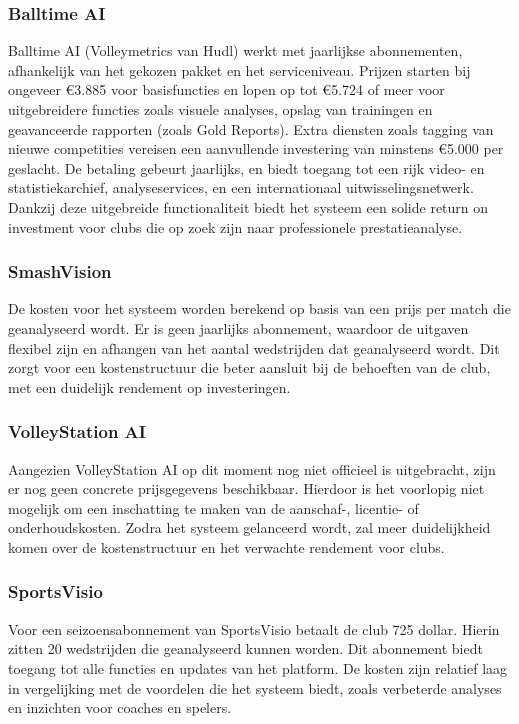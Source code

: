 \subsubsection{Balltime AI}
Balltime AI (Volleymetrics van Hudl) werkt met jaarlijkse abonnementen, afhankelijk van het gekozen pakket en het serviceniveau. Prijzen starten bij ongeveer €3.885 voor basisfuncties en lopen op tot €5.724 of meer voor uitgebreidere functies zoals visuele analyses, opslag van trainingen en geavanceerde rapporten (zoals Gold Reports). Extra diensten zoals tagging van nieuwe competities vereisen een aanvullende investering van minstens €5.000 per geslacht. De betaling gebeurt jaarlijks, en biedt toegang tot een rijk video- en statistiekarchief, analyseservices, en een internationaal uitwisselingsnetwerk. Dankzij deze uitgebreide functionaliteit biedt het systeem een solide return on investment voor clubs die op zoek zijn naar professionele prestatieanalyse.
\subsubsection{SmashVision}
De kosten voor het systeem worden berekend op basis van een prijs per match die geanalyseerd wordt. Er is geen jaarlijks abonnement, waardoor de uitgaven flexibel zijn en afhangen van het aantal wedstrijden dat geanalyseerd wordt. Dit zorgt voor een kostenstructuur die beter aansluit bij de behoeften van de club, met een duidelijk rendement op investeringen.
\subsubsection{VolleyStation AI}
Aangezien VolleyStation AI op dit moment nog niet officieel is uitgebracht, zijn er nog geen concrete prijsgegevens beschikbaar. Hierdoor is het voorlopig niet mogelijk om een inschatting te maken van de aanschaf-, licentie- of onderhoudskosten. Zodra het systeem gelanceerd wordt, zal meer duidelijkheid komen over de kostenstructuur en het verwachte rendement voor clubs.
\subsubsection{SportsVisio}
Voor een seizoensabonnement van SportsVisio betaalt de club 725 dollar. Hierin zitten 20 wedstrijden die geanalyseerd kunnen worden. Dit abonnement biedt toegang tot alle functies en updates van het platform. De kosten zijn relatief laag in vergelijking met de voordelen die het systeem biedt, zoals verbeterde analyses en inzichten voor coaches en spelers.

